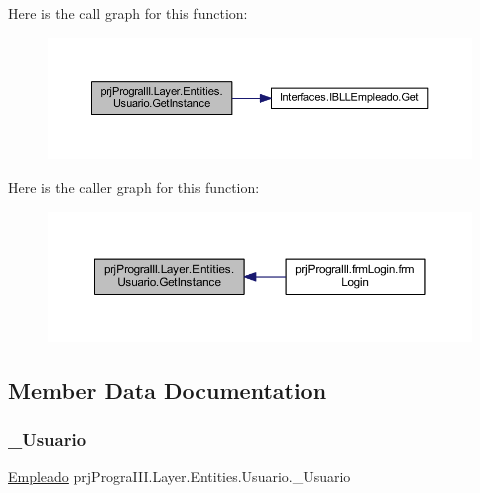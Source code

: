 Here is the call graph for this function\+:
\nopagebreak
\begin{figure}[H]
\begin{center}
\leavevmode
\includegraphics[width=350pt]{classprj_progra_i_i_i_1_1_layer_1_1_entities_1_1_usuario_a54df50298c6cc60b0b8a6843f5c88d83_cgraph}
\end{center}
\end{figure}
Here is the caller graph for this function\+:
\nopagebreak
\begin{figure}[H]
\begin{center}
\leavevmode
\includegraphics[width=350pt]{classprj_progra_i_i_i_1_1_layer_1_1_entities_1_1_usuario_a54df50298c6cc60b0b8a6843f5c88d83_icgraph}
\end{center}
\end{figure}


\subsection{Member Data Documentation}
\hypertarget{classprj_progra_i_i_i_1_1_layer_1_1_entities_1_1_usuario_a5b6c5d7568f24956ae28af40c3e01d44}{}\label{classprj_progra_i_i_i_1_1_layer_1_1_entities_1_1_usuario_a5b6c5d7568f24956ae28af40c3e01d44} 
\subsubsection{\texorpdfstring{\+\_\+\+Usuario}{\_Usuario}}
{\footnotesize\ttfamily \hyperlink{classprj_progra_i_i_i_1_1_layer_1_1_entities_1_1_empleado}{Empleado} prj\+Progra\+I\+I\+I.\+Layer.\+Entities.\+Usuario.\+\_\+\+Usuario\hspace{0.3cm}{\ttfamily [static]}}



